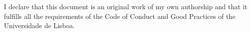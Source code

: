 I declare that this document is an original work of my own authorship and that it fulfills all the
requirements of the Code of Conduct and Good Practices of the Universidade de Lisboa. 